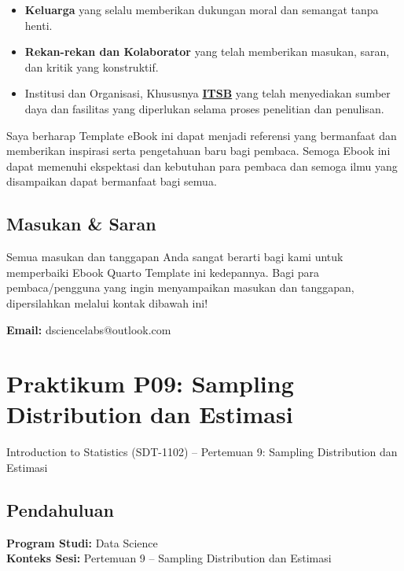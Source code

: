 \documentclass[
  indonesian,
  letterpaper,
]{book}
\providecommand{\tightlist}{%
  \setlength{\itemsep}{0pt}\setlength{\parskip}{0pt}}
\begin{document}
\begin{itemize}
\tightlist
\item
  \textbf{Keluarga} yang selalu memberikan dukungan moral dan semangat
  tanpa henti.
\item
  \textbf{Rekan-rekan dan Kolaborator} yang telah memberikan masukan,
  saran, dan kritik yang konstruktif.
\item
  Institusi dan Organisasi, Khususnya
  \textbf{\href{https://itsb.ac.id/}{ITSB}} yang telah menyediakan
  sumber daya dan fasilitas yang diperlukan selama proses penelitian dan
  penulisan.
\end{itemize}

Saya berharap Template eBook ini dapat menjadi referensi yang bermanfaat
dan memberikan inspirasi serta pengetahuan baru bagi pembaca. Semoga
Ebook ini dapat memenuhi ekspektasi dan kebutuhan para pembaca dan
semoga ilmu yang disampaikan dapat bermanfaat bagi semua.

\section*{Masukan \& Saran}\label{masukan-saran}


Semua masukan dan tanggapan Anda sangat berarti bagi kami untuk
memperbaiki Ebook Quarto Template ini kedepannya. Bagi para
pembaca/pengguna yang ingin menyampaikan masukan dan tanggapan,
dipersilahkan melalui kontak dibawah ini!

\textbf{Email:} dsciencelabs@outlook.com


\chapter{Praktikum P09: Sampling Distribution dan
Estimasi}\label{praktikum-p09-sampling-distribution-dan-estimasi}

Introduction to Statistics (SDT-1102) -- Pertemuan 9: Sampling
Distribution dan Estimasi

\hfill\break

\section{Pendahuluan}\label{pendahuluan}

\textbf{Program Studi:} Data Science\\
\textbf{Konteks Sesi:} Pertemuan 9 -- Sampling Distribution dan Estimasi
\end{document}
